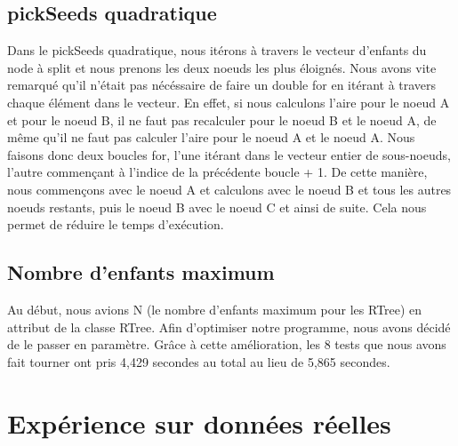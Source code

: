 \documentclass[utf8]{article}
\begin{document}
\begin{large}
    \subsection{pickSeeds quadratique}
    \indent
    \par
    Dans le pickSeeds quadratique, nous itérons à travers le vecteur d'enfants du node à
    split et nous prenons les deux noeuds les plus éloignés. Nous avons vite
    remarqué qu'il n'était pas nécéssaire de faire un double for en itérant à travers chaque
    élément dans le vecteur. En effet, si nous calculons l'aire pour le noeud A
    et pour le noeud B, il ne faut pas recalculer pour le noeud B et le noeud A, de
    même qu'il ne faut pas calculer l'aire pour le noeud A et le noeud A. Nous
    faisons donc deux boucles for, l'une itérant dans le vecteur entier de
    sous-noeuds, l'autre commençant à l'indice de la précédente boucle + 1. De cette
    manière, nous commençons avec le noeud A et calculons avec le noeud B et tous
    les autres noeuds restants, puis le noeud B avec le noeud C et ainsi de suite. Cela nous permet de réduire le temps d'exécution.

    \subsection{Nombre d'enfants maximum}
    \indent
    \par
    Au début, nous avions N (le nombre d'enfants maximum pour les RTree) en
    attribut de la classe RTree. Afin d'optimiser notre programme, nous avons
    décidé de le passer en paramètre. Grâce à cette amélioration, les 8 tests que
    nous avons fait tourner ont pris 4,429 secondes au total au lieu de 5,865
    secondes.


    \section{Expérience sur données réelles}

\end{large}
\end{document}
